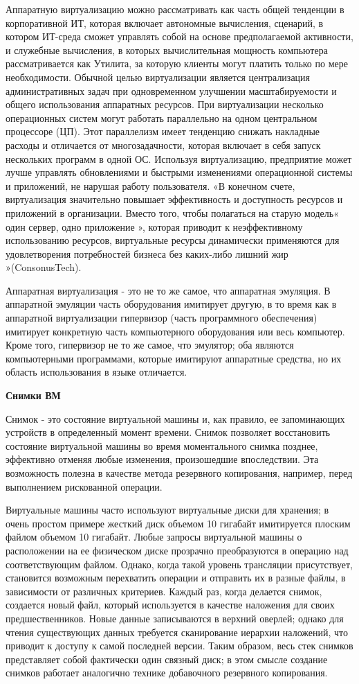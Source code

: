 Аппаратную виртуализацию можно рассматривать как часть общей тенденции в корпоративной ИТ, которая включает автономные вычисления, сценарий, в котором ИТ-среда сможет управлять собой на основе предполагаемой активности, и служебные вычисления, в которых вычислительная мощность компьютера рассматривается как Утилита, за которую клиенты могут платить только по мере необходимости. Обычной целью виртуализации является централизация административных задач при одновременном улучшении масштабируемости и общего использования аппаратных ресурсов. При виртуализации несколько операционных систем могут работать параллельно на одном центральном процессоре (ЦП). Этот параллелизм имеет тенденцию снижать накладные расходы и отличается от многозадачности, которая включает в себя запуск нескольких программ в одной ОС. Используя виртуализацию, предприятие может лучше управлять обновлениями и быстрыми изменениями операционной системы и приложений, не нарушая работу пользователя. «В конечном счете, виртуализация значительно повышает эффективность и доступность ресурсов и приложений в организации. Вместо того, чтобы полагаться на старую модель« один сервер, одно приложение », которая приводит к неэффективному использованию ресурсов, виртуальные ресурсы динамически применяются для удовлетворения потребностей бизнеса без каких-либо лишний жир »(ConsonusTech).


Аппаратная виртуализация - это не то же самое, что аппаратная эмуляция. В аппаратной эмуляции часть оборудования имитирует другую, в то время как в аппаратной виртуализации гипервизор (часть программного обеспечения) имитирует конкретную часть компьютерного оборудования или весь компьютер. Кроме того, гипервизор не то же самое, что эмулятор; оба являются компьютерными программами, которые имитируют аппаратные средства, но их область использования в языке отличается.


\textbf{Снимки ВМ}


Снимок - это состояние виртуальной машины и, как правило, ее запоминающих устройств в определенный момент времени. Снимок позволяет восстановить состояние виртуальной машины во время моментального снимка позднее, эффективно отменяя любые изменения, произошедшие впоследствии. Эта возможность полезна в качестве метода резервного копирования, например, перед выполнением рискованной операции.


Виртуальные машины часто используют виртуальные диски для хранения; в очень простом примере жесткий диск объемом 10 гигабайт имитируется плоским файлом объемом 10 гигабайт. Любые запросы виртуальной машины о расположении на ее физическом диске прозрачно преобразуются в операцию над соответствующим файлом. Однако, когда такой уровень трансляции присутствует, становится возможным перехватить операции и отправить их в разные файлы, в зависимости от различных критериев. Каждый раз, когда делается снимок, создается новый файл, который используется в качестве наложения для своих предшественников. Новые данные записываются в верхний оверлей; однако для чтения существующих данных требуется сканирование иерархии наложений, что приводит к доступу к самой последней версии. Таким образом, весь стек снимков представляет собой фактически один связный диск; в этом смысле создание снимков работает аналогично технике добавочного резервного копирования.


